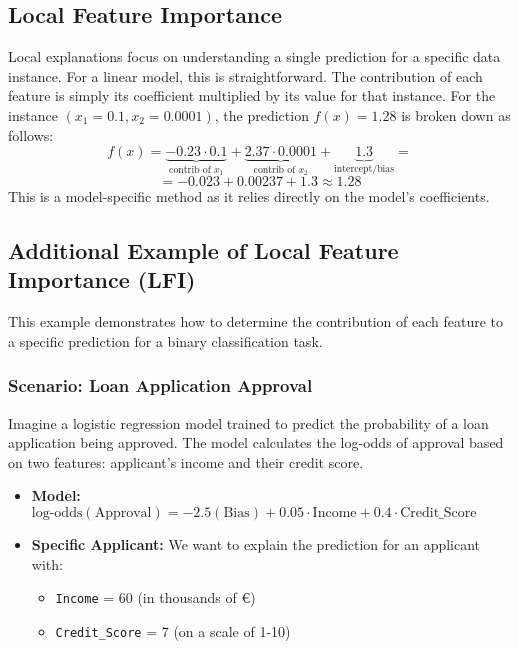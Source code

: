 \documentclass{article}
\begin{document}
\begin{multicols}{2}
\subsection{Local Feature Importance}
Local explanations focus on understanding a single prediction for a specific data instance. For a linear model, this is straightforward. The contribution of each feature is simply its coefficient multiplied by its value for that instance. For the instance $(x_1=0.1, x_2=0.0001)$, the prediction $f(x)=1.28$ is broken down as follows:
$$ f(x) = \underbrace{-0.23 \cdot 0.1}_{\text{contrib of } x_1} + \underbrace{2.37 \cdot 0.0001}_{\text{contrib of } x_2} + \underbrace{1.3}_{\text{intercept/bias}} =$$ 
$$= -0.023 + 0.00237 + 1.3 \approx 1.28 $$
This is a model-specific method as it relies directly on the model's coefficients.


\subsection{Additional Example of Local Feature Importance (LFI)}

This example demonstrates how to determine the contribution of each feature to a specific prediction for a binary classification task.

\subsubsection{Scenario: Loan Application Approval}

Imagine a logistic regression model trained to predict the probability of a loan application being approved. The model calculates the log-odds of approval based on two features: applicant's income and their credit score.

\begin{itemize}
    \item \textbf{Model:} $\text{log-odds}(\text{Approval}) = -2.5 (\text{Bias}) + 0.05 \cdot \text{Income} + 0.4 \cdot \text{Credit\_Score}$
    \item \textbf{Specific Applicant:} We want to explain the prediction for an applicant with:
    \begin{itemize}
        \item \texttt{Income} = 60 (in thousands of €)
        \item \texttt{Credit\_Score} = 7 (on a scale of 1-10)
    \end{itemize}
\end{itemize}


\end{multicols}
\end{document}
